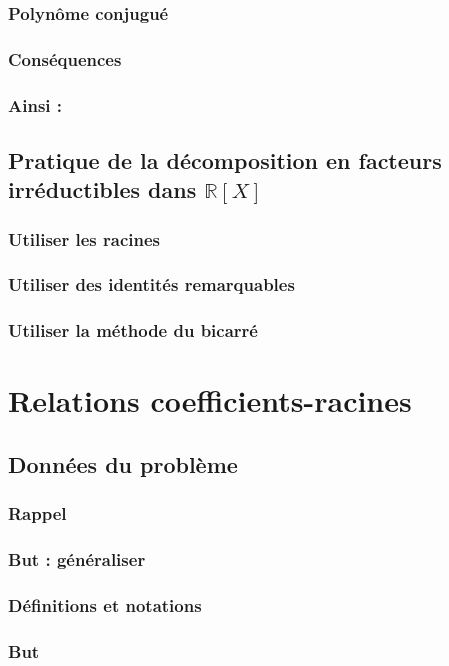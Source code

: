 \documentclass[12pt,a4paper,french]{book}
\begin{document}
			\subsubsection{Polynôme conjugué}
			\subsubsection{Conséquences}
			\subsubsection{Ainsi :}
		\subsection{Pratique de la décomposition en facteurs irréductibles dans $\mathbb{R}[X]$}
			\subsubsection{Utiliser les racines}
			\subsubsection{Utiliser des identités remarquables}
			\subsubsection{Utiliser la méthode du bicarré}
	\section{Relations coefficients-racines}
		\subsection{Données du problème}
			\subsubsection{Rappel}
			\subsubsection{But : généraliser}
			\subsubsection{Définitions et notations}
			\subsubsection{But}
\end{document}
